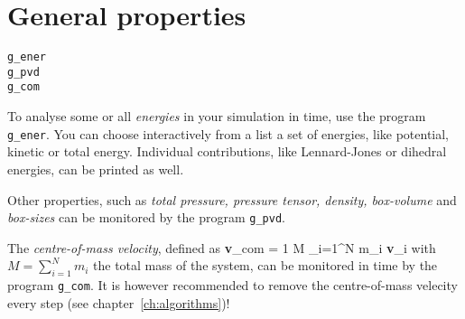 \section{General properties}
\label{sec:genprop}
\begin{verbatim}
g_ener
g_pvd
g_com
\end{verbatim}
To analyse some or all {\em energies} in your simulation in time, use the 
program {\tt g\_ener}. You can choose interactively from a list a set 
of energies, like potential, kinetic or total energy. Individual 
contributions, like Lennard-Jones or dihedral energies, can be printed as well.

Other properties, such as {\em total pressure, pressure tensor, density, 
box-volume} and {\em box-sizes} can be monitored by the program {\tt g\_pvd}.  

The {\em centre-of-mass velocity}, defined as
\beq
{\bf v}_{com} = {1 \over M} \sum_{i=1}^N m_i {\bf v}_i
\eeq
with $M = \sum_{i=1}^N m_i$ the total mass of the system, can be monitored 
in time by the program {\tt g\_com}. It is however recommended to remove the 
centre-of-mass velecity every step (see chapter~\ref{ch:algorithms})!
%
%
